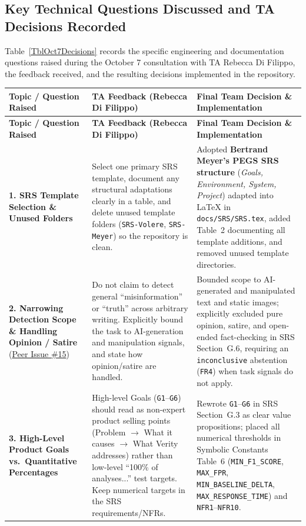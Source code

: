 \documentclass[11pt]{article}
\begin{document}
\subsection{Key Technical Questions Discussed and TA Decisions Recorded}

Table~\ref{TblOct7Decisions} records the specific engineering and documentation questions raised during the October 7 consultation with TA Rebecca Di Filippo, the feedback received, and the resulting decisions implemented in the repository.

\begin{tabularx}{\textwidth}{P{3.6cm} P{4.5cm} Y}
\caption{Summary of TA Feedback and Decisions from the October 7, 2026 Consultation} \label{TblOct7Decisions}\\
\toprule
\textbf{Topic / Question Raised} & \textbf{TA Feedback (Rebecca Di Filippo)} & \textbf{Final Team Decision \& Implementation}\\
\midrule
\endfirsthead
\toprule
\textbf{Topic / Question Raised} & \textbf{TA Feedback (Rebecca Di Filippo)} & \textbf{Final Team Decision \& Implementation}\\
\midrule
\endhead
\bottomrule
\endfoot
\textbf{1. SRS Template Selection \& Unused Folders} & Select one primary SRS template, document any structural adaptations clearly in a table, and delete unused template folders (\texttt{SRS-Volere}, \texttt{SRS-Meyer}) so the repository is clean. & Adopted \textbf{Bertrand Meyer's PEGS SRS structure} (\textit{Goals, Environment, System, Project}) adapted into \LaTeX{} in \texttt{docs/SRS/SRS.tex}, added Table~2 documenting all template additions, and removed unused template directories.\\
\addlinespace
\textbf{2. Narrowing Detection Scope \& Handling Opinion / Satire} (\href{https://github.com/richy1337/Verity/issues/15}{Peer Issue \#15}) & Do not claim to detect general ``misinformation'' or ``truth'' across arbitrary writing. Explicitly bound the task to AI-generation and manipulation signals, and state how opinion/satire are handled. & Bounded scope to AI-generated and manipulated text and static images; explicitly excluded pure opinion, satire, and open-ended fact-checking in SRS Section~G.6, requiring an \texttt{inconclusive} abstention (\texttt{FR4}) when task signals do not apply.\\
\addlinespace
\textbf{3. High-Level Product Goals vs.\ Quantitative Percentages} & High-level Goals (\texttt{G1}--\texttt{G6}) should read as non-expert product selling points (Problem $\to$ What it causes $\to$ What Verity addresses) rather than low-level ``100\% of analyses...'' test targets. Keep numerical targets in the SRS requirements/NFRs. & Rewrote \texttt{G1}--\texttt{G6} in SRS Section~G.3 as clear value propositions; placed all numerical thresholds in Symbolic Constants Table~6 (\texttt{MIN\_F1\_SCORE}, \texttt{MAX\_FPR}, \texttt{MIN\_BASELINE\_DELTA}, \texttt{MAX\_RESPONSE\_TIME}) and \texttt{NFR1}--\texttt{NFR10}.\\

\end{tabularx}
\end{document}
